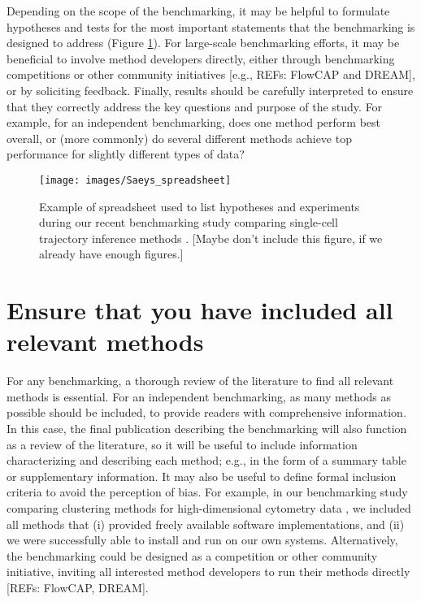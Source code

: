 \documentclass[12pt, a4paper]{article}
\begin{document}
Depending on the scope of the benchmarking, it may be helpful to formulate hypotheses and tests for the most important statements that the benchmarking is designed to address (Figure \ref{fig:spreadsheet_hypotheses}). For large-scale benchmarking efforts, it may be beneficial to involve method developers directly, either through benchmarking competitions or other community initiatives [e.g., REFs: FlowCAP and DREAM], or by soliciting feedback. Finally, results should be carefully interpreted to ensure that they correctly address the key questions and purpose of the study. For example, for an independent benchmarking, does one method perform best overall, or (more commonly) do several different methods achieve top performance for slightly different types of data?



\vskip 5mm

\begin{figure}[H]
\begin{center}
\texttt{[image: images/Saeys\_spreadsheet]}
\end{center}
\caption{Example of spreadsheet used to list hypotheses and experiments during our recent benchmarking study comparing single-cell trajectory inference methods \citep{Saelens2018b}. [Maybe don't include this figure, if we already have enough figures.]}
\label{fig:spreadsheet_hypotheses}
\end{figure}




\section{Ensure that you have included all relevant methods}

For any benchmarking, a thorough review of the literature to find all relevant methods is essential. For an independent benchmarking, as many methods as possible should be included, to provide readers with comprehensive information. In this case, the final publication describing the benchmarking will also function as a review of the literature, so it will be useful to include information characterizing and describing each method; e.g., in the form of a summary table or supplementary information. It may also be useful to define formal inclusion criteria to avoid the perception of bias. For example, in our benchmarking study comparing clustering methods for high-dimensional cytometry data \citep{Weber2016}, we included all methods that (i) provided freely available software implementations, and (ii) we were successfully able to install and run on our own systems. Alternatively, the benchmarking could be designed as a competition or other community initiative, inviting all interested method developers to run their methods directly [REFs: FlowCAP, DREAM].
\end{document}
